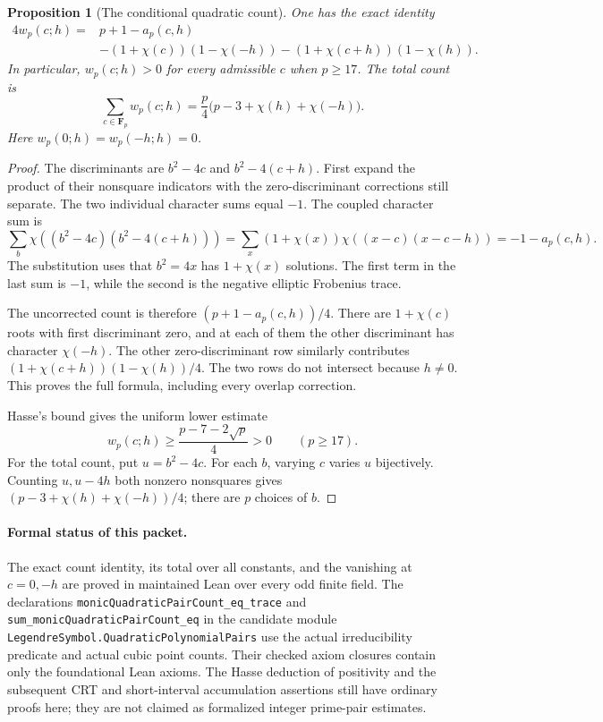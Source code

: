 \documentclass[11pt]{article}
\newtheorem{proposition}[theorem]{Proposition}
\newcommand{\F}{\mathbf F}
\begin{document}
\begin{proposition}[The conditional quadratic count]
\label{prop:quadraticEllipticCount}
One has the exact identity
\begin{align}
4w_p(c;h)={}&p+1-a_p(c,h)\nonumber\\
 &-(1+\chi(c))(1-\chi(-h))
  -(1+\chi(c+h))(1-\chi(h)).
 \label{eq:quadraticEllipticCount}
\end{align}
In particular, \(w_p(c;h)>0\) for every admissible \(c\) when
\(p\geq17\).
The total count is
\[
 \sum_{c\in\F_p}w_p(c;h)
       =\frac p4\bigl(p-3+\chi(h)+\chi(-h)\bigr).
\]
Here \(w_p(0;h)=w_p(-h;h)=0\).
\end{proposition}
\begin{proof}
The discriminants are \(b^2-4c\) and \(b^2-4(c+h)\).
First expand the product of their nonsquare indicators with the
zero-discriminant corrections still separate. The two individual
character sums equal \(-1\).
The coupled character sum is
\[
 \sum_b\chi((b^2-4c)(b^2-4(c+h)))
 =\sum_x(1+\chi(x))\chi((x-c)(x-c-h))
 =-1-a_p(c,h).
\]
The substitution uses that \(b^2=4x\) has \(1+\chi(x)\) solutions.
The first term in the last sum is \(-1\), while the second is the
negative elliptic Frobenius trace.

The uncorrected count is therefore
\((p+1-a_p(c,h))/4\).
There are \(1+\chi(c)\) roots with first discriminant zero, and at
each of them the other discriminant has character \(\chi(-h)\).
The other zero-discriminant row similarly contributes
\((1+\chi(c+h))(1-\chi(h))/4\).
The two rows do not intersect because \(h\ne0\).
This proves the full formula, including every overlap correction.

Hasse's bound gives the uniform lower estimate
\[
 w_p(c;h)\geq\frac{p-7-2\sqrt p}{4}>0\qquad(p\geq17).
\]
For the total count, put \(u=b^2-4c\).
For each \(b\), varying \(c\) varies \(u\) bijectively.
Counting \(u,u-4h\) both nonzero nonsquares gives
\((p-3+\chi(h)+\chi(-h))/4\); there are \(p\) choices of \(b\).
\end{proof}

\paragraph{Formal status of this packet.}
The exact count identity, its total over all constants, and the vanishing
at \(c=0,-h\) are proved in maintained Lean over every odd finite field.
The declarations
\texttt{monicQuadraticPairCount\_eq\_trace} and
\texttt{sum\_monicQuadraticPairCount\_eq} in the candidate module
\texttt{LegendreSymbol.QuadraticPolynomialPairs}
use the actual irreducibility predicate and actual cubic point counts.
Their checked axiom closures contain only the foundational Lean axioms.
The Hasse deduction of positivity and the subsequent CRT and
short-interval accumulation assertions still have ordinary proofs here;
they are not claimed as formalized integer prime-pair estimates.
\end{document}
